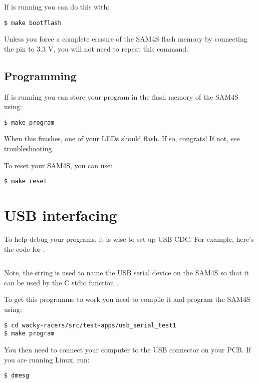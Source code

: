 If  is running you can do this with:

\begin{verbatim}
$ make bootflash
\end{verbatim}

Unless you force a complete erasure of the SAM4S flash memory by
connecting the  pin to 3.3 V, you will not need to repeat
this command.

\subsection{Programming}
\label{programming}

If  is running you can store your program in the flash
memory of the SAM4S using:

\begin{verbatim}
$ make program
\end{verbatim}

When this finishes, one of your LEDs should flash. If so, congrats! If
not, see \protect\hyperref[troubleshooting]{troubleshooting}.

To reset your SAM4S, you can use:
%
\begin{verbatim}
$ make reset
\end{verbatim}

\section{USB interfacing}
\label{usb-interfacing}

To help debug your programs, it is wise to set up USB CDC. For
example, here's the code for
.

\inputminted{C}{../../src/test-apps/usb_serial_test1/usb_serial_test1.c}

Note, the string  is used to name the USB serial
device on the SAM4S so that it can be used by the C stdio function
.   

To get this programme to work you need to compile it and program the SAM4S using:

\begin{verbatim}
$ cd wacky-racers/src/test-apps/usb_serial_test1
$ make program
\end{verbatim}

You then need to connect your computer to the USB connector on your PCB.
If you are running Linux, run:
%
\begin{verbatim}
$ dmesg
\end{verbatim}

